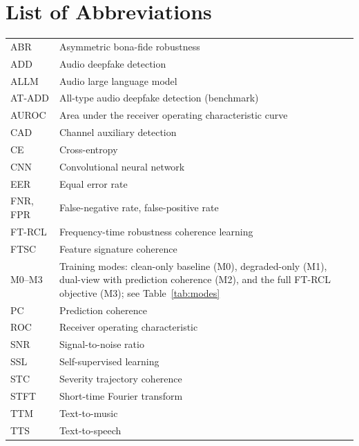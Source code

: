 \chapter*{List of Abbreviations}
\begingroup
\singlespacing\small
\renewcommand{\arraystretch}{1.25}
\noindent
\begin{tabular}{@{}p{}p{}@{}}
ABR      & Asymmetric bona-fide robustness \\
ADD      & Audio deepfake detection \\
ALLM     & Audio large language model \\
AT-ADD   & All-type audio deepfake detection (benchmark) \\
AUROC    & Area under the receiver operating characteristic curve \\
CAD      & Channel auxiliary detection \\
CE       & Cross-entropy \\
CNN      & Convolutional neural network \\
EER      & Equal error rate \\
FNR, FPR & False-negative rate, false-positive rate \\
FT-RCL   & Frequency-time robustness coherence learning \\
FTSC     & Feature signature coherence \\
M0--M3   & Training modes: clean-only baseline (M0), degraded-only (M1), dual-view with prediction coherence (M2), and the full FT-RCL objective (M3); see Table~\ref{tab:modes} \\
PC       & Prediction coherence \\
ROC      & Receiver operating characteristic \\
SNR      & Signal-to-noise ratio \\
SSL      & Self-supervised learning \\
STC      & Severity trajectory coherence \\
STFT     & Short-time Fourier transform \\
TTM      & Text-to-music \\
TTS      & Text-to-speech \\
\end{tabular}
\endgroup

